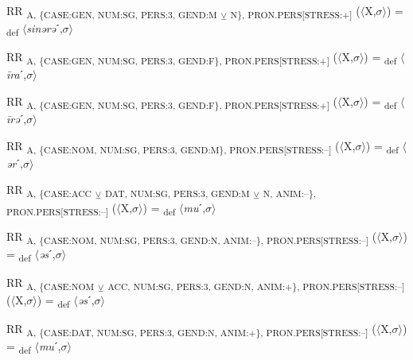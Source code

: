 {\begin{exe}
 RR \textsubscript{A, \{CASE:GEN, NUM:SG, PERS:3, GEND:M} \textsubscript{${\veebar}$}\textsubscript{ N\}, PRON.PERS[STRESS:+]} ($\langle$X,$\sigma $$\rangle$) = \textsubscript{def} $\langle$\textit{sinərə}ˊ,$\sigma $$\rangle$
\end{exe}

\begin{exe}
 RR \textsubscript{A, \{CASE:GEN, NUM:SG, PERS:3, GEND:F\}, PRON.PERS[STRESS:+]} ($\langle$X,$\sigma $$\rangle$) = \textsubscript{def} $\langle$\textit{\=ira}ˊ,$\sigma $$\rangle$
\end{exe}

\begin{exe}
 RR \textsubscript{A, \{CASE:GEN, NUM:SG, PERS:3, GEND:F\}, PRON.PERS[STRESS:+]} ($\langle$X,$\sigma $$\rangle$) = \textsubscript{def} $\langle$\textit{\=irə}ˊ,$\sigma $$\rangle$
\end{exe}

\begin{exe}
 RR \textsubscript{A, \{CASE:NOM, NUM:SG, PERS:3, GEND:M\}, PRON.PERS[STRESS:–]} ($\langle$X,$\sigma $$\rangle$) = \textsubscript{def} $\langle$\textit{ər}ˊ,$\sigma $$\rangle$
\end{exe}

\begin{exe}
 RR \textsubscript{A, \{CASE:ACC} \textsubscript{${\veebar}$}\textsubscript{ DAT, NUM:SG, PERS:3, GEND:M} \textsubscript{${\veebar}$}\textsubscript{ N, ANIM:–\}, PRON.PERS[STRESS:–]} ($\langle$X,$\sigma $$\rangle$) = \textsubscript{def} $\langle$\textit{mu}ˊ,$\sigma $$\rangle$
\end{exe}

\begin{exe}
 RR \textsubscript{A, \{CASE:NOM, NUM:SG, PERS:3, GEND:N, ANIM:–\}, PRON.PERS[STRESS:–]} ($\langle$X,$\sigma $$\rangle$) = \textsubscript{def} $\langle$\textit{əs}ˊ,$\sigma $$\rangle$
\end{exe}

\begin{exe}
 RR \textsubscript{A, \{CASE:NOM} \textsubscript{${\veebar}$}\textsubscript{ ACC, NUM:SG, PERS:3, GEND:N, ANIM:+\}, PRON.PERS[STRESS:–]} ($\langle$X,$\sigma $$\rangle$) = \textsubscript{def} $\langle$\textit{əs}ˊ,$\sigma $$\rangle$
\end{exe}

\begin{exe}
 RR \textsubscript{A, \{CASE:DAT, NUM:SG, PERS:3, GEND:N, ANIM:+\}, PRON.PERS[STRESS:–]} ($\langle$X,$\sigma $$\rangle$) = \textsubscript{def} $\langle$\textit{mu}ˊ,$\sigma $$\rangle$
\end{exe}

}
